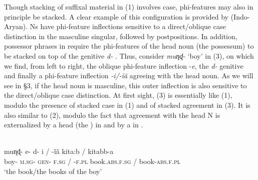 \documentclass[output=paper]{langsci/langscibook}
\begin{document}
Though stacking of suffixal material in  (1) involves case, phi-features may also in principle be stacked. A clear example of this configuration is provided by  (Indo-Aryan).  Ns have phi-feature inflections sensitive to a direct\slash {}oblique case distinction in the masculine singular, followed by postpositions. In addition, possessor phrases in  require the phi-features of the head noun (the possessum) to be stacked on top of the genitive \textit{d-} . Thus, consider \textit{muɳɖ}{}- ‘boy’ in (3), on which we find, from left to right, the oblique phi-feature inflection -\textit{e}, the \textit{d-} genitive  and finally a phi-feature inflection \textit{{}-}\textit{i/-ĩã} agreeing with the head noun. As we will see in §3, if the head noun is masculine, this outer inflection is also sensitive to the direct\slash {}oblique case distinction. At first sight,  (3) is essentially like  (1), modulo the presence of stacked case in (1) and of stacked agreement in (3). It is also similar to  (2), modulo the fact that agreement with the head N is externalized by a head (the ) in  and by a  in . 

\ea%
 \citep[316]{Manzini2015}\\
\gll muɳɖ- e-  d-  i / -ĩã    kita:b   /   kitabb-a\\
     boy- \textsc{m.sg-} \textsc{gen-}  \textsc{f.sg} / \textsc{-f.pl}  book.\textsc{abs.f.sg} /   book-\textsc{abs.f.pl}\\
\glt ‘the book/the books of the boy’
\z
\end{document}
